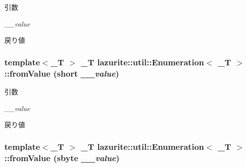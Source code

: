 \begin{DoxyParams}{引数}
\item[{\em \_\-\_\-value}]\end{DoxyParams}
\begin{DoxyReturn}{戻り値}

\end{DoxyReturn}
\hypertarget{classlazurite_1_1util_1_1_enumeration_3_01___t_01_4_a2d3faa336b828f6d2611544a3258a159}{
\subsubsection[{fromValue}]{\setlength{\rightskip}{0pt plus 5cm}template$<$\_\-T $>$ \_\-T lazurite::util::Enumeration$<$ \_\-T $>$::fromValue (short {\em \_\-\_\-value})}}
\label{classlazurite_1_1util_1_1_enumeration_3_01___t_01_4_a2d3faa336b828f6d2611544a3258a159}

\begin{DoxyParams}{引数}
\item[{\em \_\-\_\-value}]\end{DoxyParams}
\begin{DoxyReturn}{戻り値}

\end{DoxyReturn}
\hypertarget{classlazurite_1_1util_1_1_enumeration_3_01___t_01_4_ab8a3b7b2534ac097300b957433379108}{
\subsubsection[{fromValue}]{\setlength{\rightskip}{0pt plus 5cm}template$<$\_\-T $>$ \_\-T lazurite::util::Enumeration$<$ \_\-T $>$::fromValue (sbyte {\em \_\-\_\-value})}}
\label{classlazurite_1_1util_1_1_enumeration_3_01___t_01_4_ab8a3b7b2534ac097300b957433379108}

